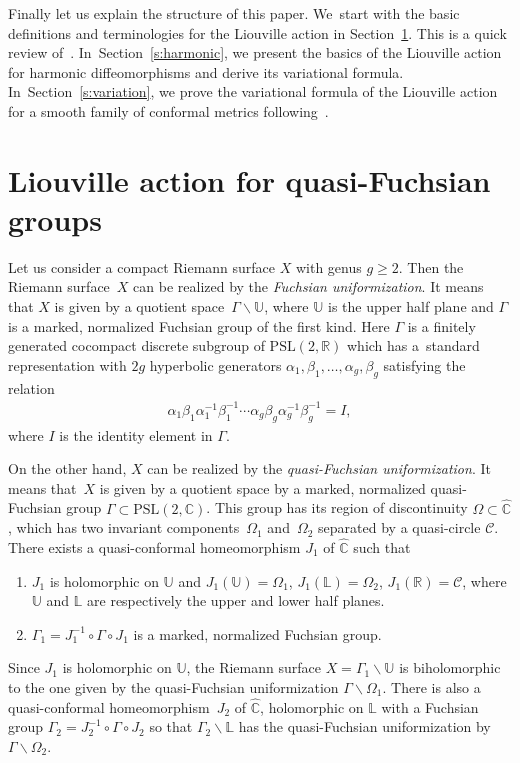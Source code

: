 \documentclass[pdftex]{sigma}%
\numberwithin{equation}{section}
\newcommand{\bk}{\backslash}
\begin{document}
Finally let us explain the structure of this paper. We~start with the basic definitions and ter\-minologies for the Liouville action in Section~\ref{sec2}. This is a quick review of~\cite[Section~2]{2}. In~Section~\ref{s:harmonic}, we present the basics of the Liouville action for harmonic diffeomorphisms and derive its variational formula. In~Section~\ref{s:variation}, we prove the variational formula of the Liouville action for a smooth family of conformal metrics following~\cite[Section~4]{2}.

\section{Liouville action for quasi-Fuchsian groups}\label{sec2}

Let us consider a compact Riemann surface $X$ with genus $g\geq 2$. Then the Riemann surface~$X$ can be realized by the \emph{Fuchsian uniformization}. It means that $X$ is given by
a quotient space~$\Gamma\bk\mathbb{U}$, where $\mathbb{U}$ is the upper half plane and $\Gamma$ is a marked, normalized Fuchsian group of the first kind. Here $\Gamma$ is a finitely generated cocompact discrete subgroup of $\text{PSL} (2, \mathbb{R})$ which has a~standard representation with $2g$ hyperbolic generators $\alpha_1, \beta_1, \ldots, \alpha_g, \beta_g$ satisfying the relation
\begin{gather*}
\alpha_1\beta_1\alpha_1^{-1}\beta_1^{-1}\cdots \alpha_g\beta_g\alpha_g^{-1}\beta_g^{-1}=I,
\end{gather*}
where $I$ is the identity element in $\Gamma$.

On the other hand, $X$ can be realized by the \emph{quasi-Fuchsian uniformization}. It means that~$X$ is given by a quotient space by a marked, normalized quasi-Fuchsian group $\Gamma \subset \text{PSL}(2,\mathbb{C})$.
This group has its region of discontinuity $\Omega\subset \hat{\mathbb{C}}$, which has two invariant components~$\Omega_1$ and~$\Omega_2$ separated by a quasi-circle $\mathcal{C}$. There exists a quasi-conformal homeomorphism $J_1$ of $\hat{\mathbb{C}}$ such that

\begin{enumerate}
\item[\textbf{QF1}]$J_1$ is holomorphic on $\mathbb{U}$ and $J_1(\mathbb{U})=\Omega_1$, $J_1(\mathbb{L})=\Omega_2$, $J_1(\mathbb{R})=\mathcal{C}$, where $\mathbb{U}$ and $\mathbb{L}$ are respectively the upper and lower half planes.
\item[\textbf{QF2}] $ \Gamma_1=J_1^{-1}\circ \Gamma\circ J_1$ is a marked, normalized Fuchsian group.
\end{enumerate}
 Since $J_1$ is holomorphic on $\mathbb{U}$, the Riemann surface $X=\Gamma_1\backslash \mathbb{U}$ is biholomorphic to the one given by the quasi-Fuchsian uniformization $\Gamma\backslash \Omega_1$. There is also a quasi-conformal homeomorphism~$J_2$ of $\hat{\mathbb{C}}$, holomorphic on $\mathbb{L}$ with a Fuchsian group $\Gamma_2=J_2^{-1}\circ \Gamma\circ J_2$ so that $\Gamma_2\backslash \mathbb{L}$ has the quasi-Fuchsian uniformization by $\Gamma\backslash\Omega_2$.
\end{document}
